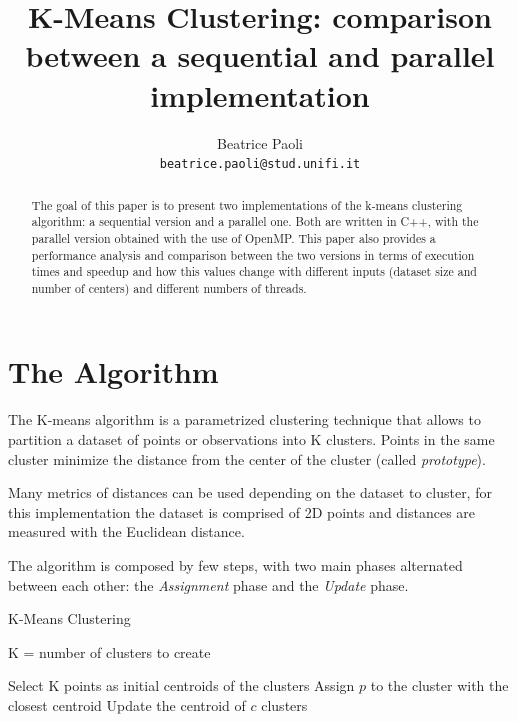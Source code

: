 \documentclass[10pt,twocolumn,letterpaper]{article}
\begin{document}
\title{K-Means Clustering: comparison between a sequential and parallel implementation}

\author{Beatrice Paoli\\
{\tt\small beatrice.paoli@stud.unifi.it}
}

\maketitle
\thispagestyle{empty}

\begin{abstract}
	The goal of this paper is to present two implementations of the k-means clustering algorithm: a sequential version and a parallel one. Both are written in C++, with the parallel version obtained with the use of OpenMP. This paper also provides a performance analysis and comparison between the two versions in terms of execution times and speedup and how this values change with different inputs (dataset size and number of centers) and different numbers of threads. 
\end{abstract}


\section{The Algorithm}

The K-means algorithm is a parametrized clustering technique that allows to partition a dataset of points or observations into K clusters. Points in the same cluster minimize the distance from the center of the cluster (called \textit{prototype}). 

Many metrics of distances can be used depending on the dataset to cluster, for this implementation the dataset is comprised of 2D points and distances are measured with the Euclidean distance.

The algorithm is composed by few steps, with two main phases alternated between each other: the \textit{Assignment} phase and the \textit{Update} phase.

\begin{algorithm}
	\label{alg:KMeansAlg}
	\caption{K-Means Clustering}
	\begin{algorithmic}
		\Require K = number of clusters to create
		\vspace{0.5cm}
		
		\State Select K points as initial centroids of the clusters
		\State Assign $p$ to the cluster with the closest centroid
		\EndFor
		\State Update the centroid of $c$
		\EndFor
		\EndWhile
		\State \Return clusters
		
	\end{algorithmic}
\end{algorithm}
\end{document}
